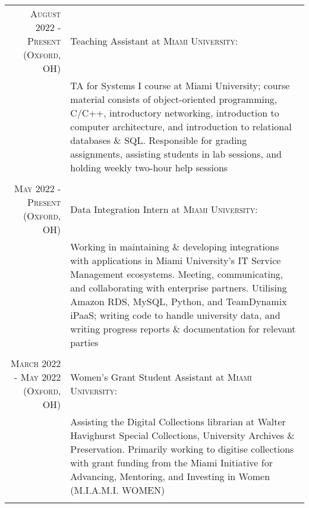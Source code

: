 \documentclass[letterpaper,8pt]{article} %
\begin{document}
\footnotesize{\begin{tabular}{r|p{12cm}}
\footnotesize{\textsc{August 2022 - Present (Oxford, OH)}} & \footnotesize{Teaching Assistant at \textsc{Miami University}}:\\
& \footnotesize{TA for Systems I course at Miami University; course material consists of object-oriented programming, C/C++, introductory networking, introduction to computer architecture, and introduction to relational databases \& SQL. Responsible for grading assignments, assisting students in lab sessions, and holding weekly two-hour help sessions}\\
\multicolumn{2}{c}{} \\


\footnotesize{\textsc{May 2022 - Present (Oxford, OH)}} & \footnotesize{Data Integration Intern at \textsc{Miami University}}:\\
& \footnotesize{Working in maintaining \& developing integrations with applications in Miami University's IT Service Management ecosystems. Meeting, communicating, and collaborating with enterprise partners.
Utilising Amazon RDS, MySQL, Python, and TeamDynamix iPaaS; writing code to handle university data, and writing progress reports \& documentation for relevant parties}\\
\multicolumn{2}{c}{} \\


\footnotesize{\textsc{March 2022 - May 2022 (Oxford, OH)}} & \footnotesize{Women's Grant Student Assistant at \textsc{Miami University}}:\\
& \footnotesize{Assisting the Digital Collections librarian at Walter Havighurst Special Collections, University Archives \& Preservation.
Primarily working to digitise collections with grant funding from the Miami Initiative for Advancing, Mentoring, and Investing in Women (M.I.A.M.I. WOMEN)}\\
\multicolumn{2}{c}{} \\


\end{tabular}}\normalsize\\

\end{document}
